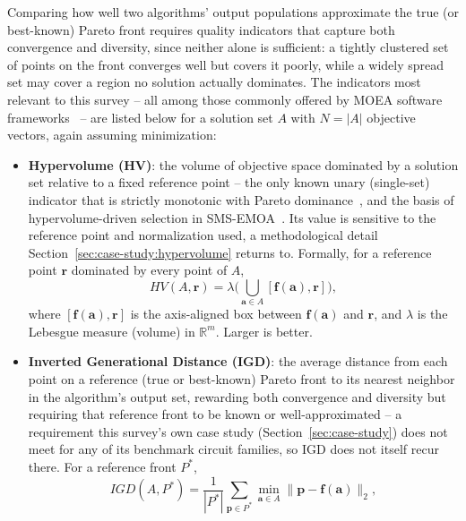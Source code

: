Comparing how well two algorithms' output populations approximate the
true (or best-known) Pareto front requires quality indicators that
capture both convergence and diversity, since neither alone is
sufficient: a tightly clustered set of points on the front converges well
but covers it poorly, while a widely spread set may cover a region no
solution actually dominates. The indicators most relevant to this
survey -- all among those commonly offered by MOEA software
frameworks~\citep{patrausanu2024frameworks} -- are listed below for a
solution set $A$ with $N = |A|$ objective vectors, again assuming
minimization:
\begin{itemize}
  \item \textbf{Hypervolume (HV)}: the volume of objective space
    dominated by a solution set relative to a fixed reference point --
    the only known unary (single-set) indicator that is strictly
    monotonic with Pareto dominance~\citep{zitzler2003performance}, and
    the basis of hypervolume-driven selection in
    SMS-EMOA~\citep{beume2007smsemoa}. Its value is sensitive to the
    reference point and normalization used, a methodological detail
    Section~\ref{sec:case-study:hypervolume} returns to. Formally, for a
    reference point $\mathbf{r}$ dominated by every point of $A$,
    \begin{equation}
      HV(A, \mathbf{r}) = \lambda\Big(\bigcup_{\mathbf{a} \in A}
      [\mathbf{f}(\mathbf{a}), \mathbf{r}]\Big),
    \end{equation}
    where $[\mathbf{f}(\mathbf{a}), \mathbf{r}]$ is the axis-aligned box
    between $\mathbf{f}(\mathbf{a})$ and $\mathbf{r}$, and $\lambda$ is the
    Lebesgue measure (volume) in $\mathbb{R}^m$. Larger is better.
  \item \textbf{Inverted Generational Distance (IGD)}: the average
    distance from each point on a reference (true or best-known) Pareto
    front to its nearest neighbor in the algorithm's output set,
    rewarding both convergence and diversity but requiring that reference
    front to be known or well-approximated -- a requirement this
    survey's own case study (Section~\ref{sec:case-study}) does not
    meet for any of its benchmark circuit families, so IGD does not
    itself recur there. For a reference front $P^*$,
    \begin{equation}
      IGD(A, P^*) = \frac{1}{|P^*|} \sum_{\mathbf{p} \in P^*}
      \min_{\mathbf{a} \in A} \big\lVert \mathbf{p} - \mathbf{f}(\mathbf{a})
      \big\rVert_2,
    \end{equation}

\end{itemize}
